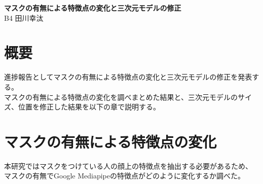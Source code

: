 \documentclass[]{jarticle}          %
\begin{document}

\vspace*{2ex}
\begin{center}
 {\Large \bf マスクの有無による特徴点の変化と三次元モデルの修正}\\ %
 \vspace*{5mm}
 {\large B4 田川幸汰}%
\end{center}






\section{概要}
 進捗報告としてマスクの有無による特徴点の変化と三次元モデルの修正を発表する。 \\
 マスクの有無による特徴点の変化を調べまとめた結果と、三次元モデルのサイズ、位置を修正した結果を以下の章で説明する。

\section{マスクの有無による特徴点の変化}
本研究ではマスクをつけている人の顔上の特徴点を抽出する必要があるため、
マスクの有無でGoogle Mediapipeの特徴点がどのように変化するか調べた。
\end{document}
